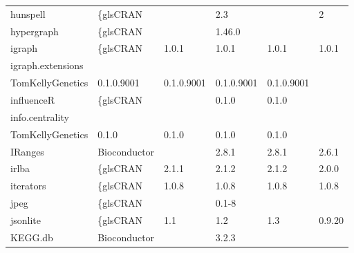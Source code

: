 \begin{longtable}{llllll}
\rowcolor{black!10}
hunspell                      & \{gls{CRAN}                      &             & 2.3         &                & 2                 \\
\rowcolor{black!5}
hypergraph                    & \{gls{CRAN}                      &             & 1.46.0      &                &                    \\
\rowcolor{black!10}
igraph                        & \{gls{CRAN}                      & 1.0.1       & 1.0.1       & 1.0.1          & 1.0.1             \\
\rowcolor{black!5}
igraph.extensions             & \begin{tabular}[c]{@{}l@{}}GitHub \\ TomKellyGenetics \end{tabular}  & 0.1.0.9001  & 0.1.0.9001  & 0.1.0.9001     & 0.1.0.9001         \\
\rowcolor{black!10}
influenceR                    & \{gls{CRAN}                      &             & 0.1.0       & 0.1.0          &                   \\
\rowcolor{black!5}
info.centrality               & \begin{tabular}[c]{@{}l@{}}GitHub \\ TomKellyGenetics \end{tabular}  & 0.1.0       & 0.1.0       & 0.1.0          & 0.1.0              \\
\rowcolor{black!10}
IRanges                       & Bioconductor              &             & 2.8.1       & 2.8.1          & 2.6.1             \\
\rowcolor{black!5}
irlba                         & \{gls{CRAN}                      & 2.1.1       & 2.1.2       & 2.1.2          & 2.0.0              \\
\rowcolor{black!10}
iterators                     & \{gls{CRAN}                      & 1.0.8       & 1.0.8       & 1.0.8          & 1.0.8             \\
\rowcolor{black!5}
jpeg                          & \{gls{CRAN}                      &             & 0.1-8       &                &                    \\
\rowcolor{black!10}
jsonlite                      & \{gls{CRAN}                      & 1.1         & 1.2         & 1.3            & 0.9.20            \\
\rowcolor{black!5}
KEGG.db                       & Bioconductor              &             & 3.2.3       &                &                    \\

\end{longtable}
